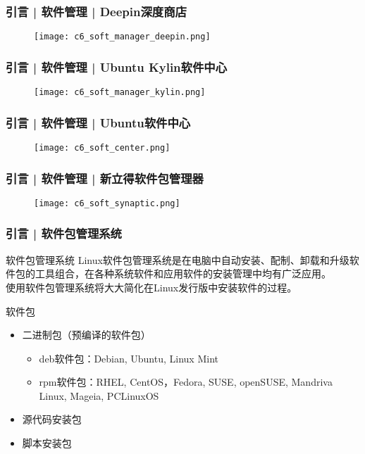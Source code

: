 \begin{frame}
  \frametitle{引言 | 软件管理 | Deepin深度商店}
  \begin{figure}
    \centering
    \texttt{[image: c6\_soft\_manager\_deepin.png]}
  \end{figure}
\end{frame}

\begin{frame}
  \frametitle{引言 | 软件管理 | Ubuntu Kylin软件中心}
  \begin{figure}
    \centering
    \texttt{[image: c6\_soft\_manager\_kylin.png]}
  \end{figure}
\end{frame}

\begin{frame}
  \frametitle{引言 | 软件管理 | Ubuntu软件中心}
  \begin{figure}
    \centering
    \texttt{[image: c6\_soft\_center.png]}
  \end{figure}
\end{frame}

\begin{frame}
  \frametitle{引言 | 软件管理 | 新立得软件包管理器}
  \begin{figure}
    \centering
    \texttt{[image: c6\_soft\_synaptic.png]}
  \end{figure}
\end{frame}

\begin{frame}
  \frametitle{引言 | 软件包管理系统}
  \begin{block}{软件包管理系统}
    Linux软件包管理系统是在电脑中自动安装、配制、卸载和升级软件包的工具组合，在各种系统软件和应用软件的安装管理中均有广泛应用。\\
    使用软件包管理系统将大大简化在Linux发行版中安装软件的过程。
  \end{block}
  \pause
  \begin{block}{\alert{软件包}}
    \begin{itemize}
      \item 二进制包（预编译的软件包）
	\begin{itemize}
    \item deb软件包：Debian, Ubuntu, Linux Mint
	  \item rpm软件包：RHEL, CentOS，Fedora, SUSE, openSUSE, Mandriva Linux, Mageia, PCLinuxOS
	\end{itemize}
      \item 源代码安装包
      \item 脚本安装包
    \end{itemize}
  \end{block}
\end{frame}

